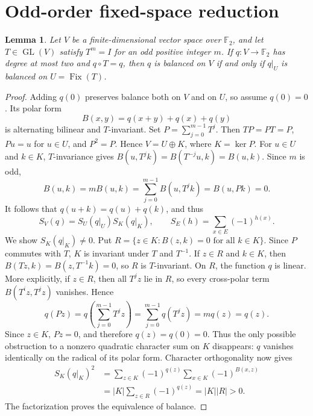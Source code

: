 \documentclass[11pt,a4paper]{article}
\newtheorem{lemma}[theorem]{Lemma}
\newcommand{\F}{\mathbb F_2}
\newcommand{\Fix}{\operatorname{Fix}}
\begin{document}
\section{Odd-order fixed-space reduction}
\begin{lemma}\label{lem:reduction}
Let $V$ be a finite-dimensional vector space over $\F$, and let $T\in\operatorname{GL}(V)$ satisfy $T^m=I$ for an odd positive integer $m$. If $q:V\to\F$ has degree at most two and $q\circ T=q$, then $q$ is balanced on $V$ if and only if $q|_U$ is balanced on $U=\Fix(T)$.
\end{lemma}
\begin{proof}
Adding $q(0)$ preserves balance both on $V$ and on $U$, so assume $q(0)=0$. Its polar form
\[B(x,y)=q(x+y)+q(x)+q(y)\]
is alternating bilinear and $T$-invariant. Set $P=\sum_{j=0}^{m-1}T^j$. Then $TP=PT=P$, $Pu=u$ for $u\in U$, and $P^2=P$. Hence $V=U\oplus K$, where $K=\ker P$. For $u\in U$ and $k\in K$, $T$-invariance gives $B(u,T^jk)=B(T^{-j}u,k)=B(u,k)$. Since $m$ is odd,
\[
B(u,k)=mB(u,k)=\sum_{j=0}^{m-1}B(u,T^jk)=B(u,Pk)=0.
\]
It follows that $q(u+k)=q(u)+q(k)$, and thus
\[S_V(q)=S_U(q|_U)S_K(q|_K),\qquad S_E(h)=\sum_{x\in E}(-1)^{h(x)}.\]
We show $S_K(q|_K)\ne0$. Put $R=\{z\in K:B(z,k)=0\text{ for all }k\in K\}$. Since $P$ commutes with $T$, $K$ is invariant under $T$ and $T^{-1}$. If $z\in R$ and $k\in K$, then $B(Tz,k)=B(z,T^{-1}k)=0$, so $R$ is $T$-invariant. On $R$, the function $q$ is linear. More explicitly, if $z\in R$, then all $T^jz$ lie in $R$, so every cross-polar term $B(T^iz,T^jz)$ vanishes. Hence
\[
q(Pz)=q\!\left(\sum_{j=0}^{m-1}T^jz\right)
     =\sum_{j=0}^{m-1}q(T^jz)
     =m q(z)=q(z).
\]
Since $z\in K$, $Pz=0$, and therefore $q(z)=q(0)=0$.
Thus the only possible obstruction to a nonzero quadratic character sum on $K$ disappears: $q$ vanishes identically on the radical of its polar form. Character orthogonality now gives
\begin{align*}
 S_K(q|_K)^2
 &=\sum_{z\in K}(-1)^{q(z)}\sum_{x\in K}(-1)^{B(x,z)}\\
 &=|K|\sum_{z\in R}(-1)^{q(z)}=|K||R|>0.
\end{align*}
The factorization proves the equivalence of balance.
\end{proof}
\end{document}
